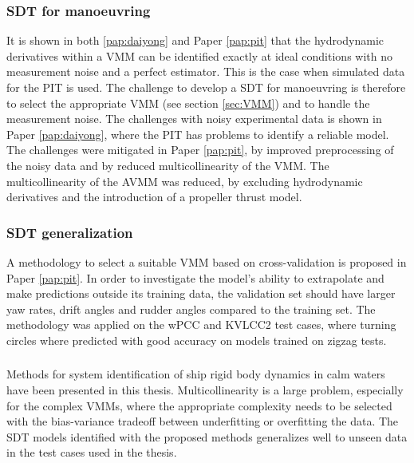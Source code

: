 \subsubsection*{SDT for manoeuvring}
It is shown in both \ref{pap:daiyong} and Paper \ref{pap:pit} that the hydrodynamic derivatives within a VMM can be identified exactly at ideal conditions with no measurement noise and a perfect estimator. This is the case when simulated data for the PIT is used.
The challenge to develop a SDT for manoeuvring is therefore to select the appropriate VMM (see section \ref{sec:VMM}) and to handle the measurement noise.
The challenges with noisy experimental data is shown in Paper \ref{pap:daiyong}, where the PIT has problems to identify a reliable model. The challenges were mitigated in Paper \ref{pap:pit}, by improved preprocessing of the noisy data and by reduced multicollinearity of the VMM. The multicollinearity of the AVMM was reduced, by excluding hydrodynamic derivatives and the introduction of a propeller thrust model.

\subsubsection*{SDT generalization}
A methodology to select a suitable VMM based on cross-validation is proposed in Paper \ref{pap:pit}. In order to investigate the model's ability to extrapolate and make predictions outside its training data, the validation set should have larger yaw rates, drift angles and rudder angles compared to the training set. The methodology was applied on the wPCC and KVLCC2 test cases, where turning circles where predicted with good accuracy on models trained on zigzag tests. 

\subsubsection*{}
Methods for system identification of ship rigid body dynamics in calm waters have been presented in this thesis. Multicollinearity is a large problem, especially for the complex VMMs, where the appropriate complexity needs to be selected with the bias-variance tradeoff between underfitting or overfitting the data. The SDT models identified with the proposed methods generalizes well to unseen data in the test cases used in the thesis.
